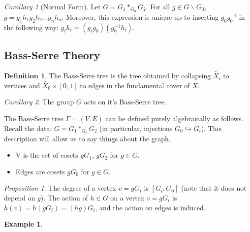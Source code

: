 \documentclass[11pt]{article}
\theoremstyle{definition}
\newtheorem{definition}{Definition}[section]
\theoremstyle{example}
\newtheorem{example}{Example}[section]
\theoremstyle{remark}
\theoremstyle{lemma}
\theoremstyle{proposition}
\newtheorem{proposition}{Proposition}[section]
\theoremstyle{Problem}
\theoremstyle{Solution}
\theoremstyle{theorem}
\theoremstyle{corollary}
\newtheorem{corollary}{Corollary}[section]
\begin{document}
\begin{corollary}[Normal Form]
Let $G=G_1 \ast_{G_0}G_2$. For all $g\in G\backslash G_0$, $g=g_1h_1g_2h_2...g_nh_n$. Moreover, this expression is unique up to inserting $g_0g_0^{-1}$ in the following way: $g_ih_i = (g_ig_0)(g_0^{-1}h_i)$.
\end{corollary}


\subsection{Bass-Serre Theory}

\begin{definition}
The Bass-Serre tree is the tree obtained by collapsing $\widetilde{X_i}$ to vertices and $\widetilde{X_0}\times[0,1]$ to edges in the fundamental cover of $X$.
\end{definition}

\begin{corollary}
The group $G$ acts on it's Bass-Serre tree.
\end{corollary}

The Bass-Serre tree $\Gamma=(V,E)$ can be defined purely algebraically as follows. Recall the data: $G=G_1 \ast_{G_0}G_2$ (in particular, injections $G_0 \hookrightarrow G_i$). This description will allow us to say things about the graph.
\begin{itemize}
\item V is the set of cosets $gG_1$, $gG_2$ for $g\in G$.
\item Edges are cosets $gG_0$ for $g\in G$.
\end{itemize}
\begin{proposition}
The degree of a vertex $v=gG_i$ is $[G_i: G_0]$ (note that it does not depend on $g$).
The action of $h\in G$ on a vertex $v=gG_i$ is $h(v)=h(gG_i)=(hg)G_i$, and the action on edges is induced.
\end{proposition}

\begin{example}
\end{example}
\end{document}

